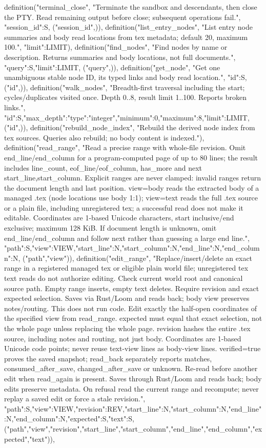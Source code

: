     definition("terminal_close", "Terminate the sandbox and descendants, then close the PTY. Read remaining output before close; subsequent operations fail.", {"session_id":S}, ("session_id",)),
    definition("list_entry_nodes", "List entry node summaries and body read locations from tex metadata; default 20, maximum 100.", {"limit":LIMIT}),
    definition("find_nodes", "Find nodes by name or description. Returns summaries and body locations, not full documents.", {"query":S,"limit":LIMIT}, ("query",)),
    definition("get_node", "Get one unambiguous stable node ID, its typed links and body read location.", {"id":S}, ("id",)),
    definition("walk_nodes", "Breadth-first traversal including the start; cycles/duplicates visited once. Depth 0..8, result limit 1..100. Reports broken links.", {"id":S,"max_depth":{"type":"integer","minimum":0,"maximum":8},"limit":LIMIT}, ("id",)),
    definition("rebuild_node_index", "Rebuild the derived node index from tex sources. Queries also rebuild; no body content is indexed."),
    definition("read_range", "Read a precise range with whole-file revision. Omit end_line/end_column for a program-computed page of up to 80 lines; the result includes line_count, eof_line/eof_column, has_more and next {start_line,start_column}. Explicit ranges are never clamped: invalid ranges return the document length and last position. view=body reads the extracted body of a managed .tex (node locations use body 1:1); view=text reads the full .tex source or a plain file, including unregistered tex; a successful read does not make it editable. Coordinates are 1-based Unicode characters, start inclusive/end exclusive; maximum 128 KiB. If document length is unknown, omit end_line/end_column and follow next rather than guessing a large end line.", {"path":S,"view":VIEW,"start_line":N,"start_column":N,"end_line":N,"end_column":N}, ("path","view")),
    definition("edit_range", "Replace/insert/delete an exact range in a registered managed tex or eligible plain world file; unregistered tex text reads do not authorize editing. Check current world root and canonical source path. Empty range inserts, empty text deletes. Require revision and exact expected selection. Saves via Rust/Loom and reads back; body view preserves notes/routing. This does not run code. Edit exactly the half-open coordinates of the specified view from read_range. expected must equal that exact selection, not the whole page unless replacing the whole page. revision hashes the entire .tex source, including notes and routing, not just body. Coordinates are 1-based Unicode code points; never reuse text-view lines as body-view lines. verified=true proves the saved snapshot; read_back separately reports matches, consumed_after_save, changed_after_save or unknown. Re-read before another edit when read_again is present. Saves through Rust/Loom and reads back; body edits preserve metadata. On refusal read the current range and recompute; never replay a saved edit or force a stale revision.", {"path":S,"view":VIEW,"revision":REV,"start_line":N,"start_column":N,"end_line":N,"end_column":N,"expected":S,"text":S}, ("path","view","revision","start_line","start_column","end_line","end_column","expected","text")),
